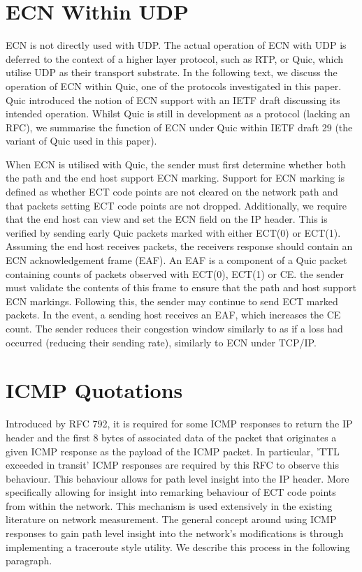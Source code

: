 \documentclass{l4proj}
\begin{document}
\section{ECN Within UDP}

ECN is not directly used with UDP. The actual operation of ECN with UDP is deferred to the context of a higher layer protocol, such as RTP, or Quic, which utilise UDP as their transport substrate. In the following text, we discuss the operation of ECN within Quic, one of the protocols investigated in this paper. Quic introduced the notion of ECN support with an IETF draft discussing its intended operation\citep{johansson_ecn_2017}. Whilst Quic is still in development as a protocol (lacking an RFC), we summarise the function of ECN under Quic within IETF draft 29\cite{thomson_quic_2020} (the variant of Quic used in this paper).


When ECN is utilised with Quic, the sender must first determine whether both the path and the end host support ECN marking. Support for ECN marking is defined as whether ECT code points are not cleared on the network path and that packets setting ECT code points are not dropped. Additionally, we require that the end host can view and set the ECN field on the IP header. This is verified by sending early Quic packets marked with either ECT(0) or ECT(1). Assuming the end host receives packets, the receivers response should contain an ECN acknowledgement frame (EAF). An EAF is a component of a Quic packet containing counts of packets observed with ECT(0), ECT(1) or CE. the sender must validate the contents of this frame to ensure that the path and host support ECN markings. Following this, the sender may continue to send ECT marked packets. In the event, a sending host receives an EAF, which increases the CE count. The sender reduces their congestion window similarly to as if a loss had occurred (reducing their sending rate), similarly to ECN under TCP/IP\cite{thomson_quic_2020}.

\section{ICMP Quotations}
\label{sec:icmp}

Introduced by RFC 792, it is required for some ICMP responses to return the IP header and the first 8 bytes of associated data of the packet that originates a given ICMP response as the payload of the ICMP packet\citep{rfc792}. In particular, 'TTL exceeded in transit' ICMP responses are required by this RFC to observe this behaviour. This behaviour allows for path level insight into the IP header. More specifically allowing for insight into remarking behaviour of ECT code points from within the network. This mechanism is used extensively in the existing literature on network measurement. The general concept around using ICMP responses to gain path level insight into the network's modifications is through implementing a traceroute style utility. We describe this process in the following paragraph.
\end{document}

